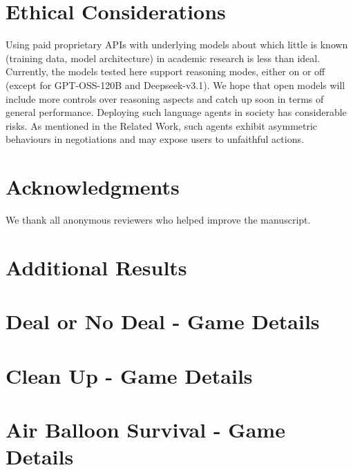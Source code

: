 \documentclass[11pt]{article}
\begin{document}
\section*{Ethical Considerations}

Using paid proprietary APIs with underlying models about which little is known (training data, model architecture) in academic research is less than ideal. Currently, the models tested here support reasoning modes, either on or off (except for GPT-OSS-120B and Deepseek-v3.1). We hope that open models will include more controls over reasoning aspects and catch up soon in terms of general performance. Deploying such language agents in society has considerable risks. As mentioned in the Related Work, such agents exhibit asymmetric behaviours in negotiations and may expose users to unfaithful actions.

\section*{Acknowledgments}
We thank all anonymous reviewers who helped improve the manuscript.

%







\appendix

\section{Additional Results}\label{sec:appendix_reamining_details}


\section{Deal or No Deal - Game Details}\label{sec:appendix_dond}



\section{Clean Up - Game Details}\label{sec:appendix_clean_up}


\section{Air Balloon Survival - Game Details}\label{sec:appendix_airballoon}

\end{document}
